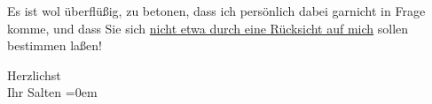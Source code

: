 \pstart
           Es ist wol überflüßig, zu betonen, dass ich persönlich dabei garnicht in Frage komme,
               und dass Sie sich \uline{nicht etwa durch eine Rücksicht auf
                  mich} sollen bestimmen laßen!\pend
           
\pstart
           Herzlichst {\\[\baselineskip]}Ihr \spacefill\mbox{Salten}\pend
           \leftskip=0em{}\endnumbering{}  
      